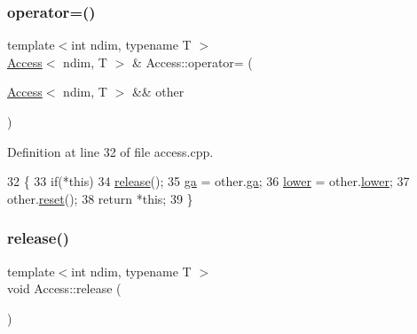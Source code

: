 \hypertarget{classshark_1_1ndim_1_1_access_a221dbc68423570496fd0e1069af4b3d1}{}\label{classshark_1_1ndim_1_1_access_a221dbc68423570496fd0e1069af4b3d1} 
\subsubsection{\texorpdfstring{operator=()}{operator=()}\hspace{0.1cm}{\footnotesize\ttfamily [2/2]}}
{\footnotesize\ttfamily template$<$int ndim, typename T $>$ \\
\hyperlink{classshark_1_1ndim_1_1_access}{Access}$<$ ndim, T $>$ \& Access\+::operator= (\begin{DoxyParamCaption}\item[{\hyperlink{classshark_1_1ndim_1_1_access}{Access}$<$ ndim, T $>$ \&\&}]{other }\end{DoxyParamCaption})}



Definition at line 32 of file access.\+cpp.


\begin{DoxyCode}
32                                                                 \{
33     \textcolor{keywordflow}{if}(*\textcolor{keyword}{this})
34         \hyperlink{classshark_1_1ndim_1_1_access_a22c889d50f5f45566ee12cf04f874701}{release}();
35     \hyperlink{classshark_1_1ndim_1_1_access_abc59e261a07fcecc3f1db641ef04efa7}{ga} = other.\hyperlink{classshark_1_1ndim_1_1_access_abc59e261a07fcecc3f1db641ef04efa7}{ga};
36     \hyperlink{classshark_1_1ndim_1_1_access_ac1e92dba307ff877963c94bd42fcbafb}{lower} = other.\hyperlink{classshark_1_1ndim_1_1_access_ac1e92dba307ff877963c94bd42fcbafb}{lower};
37     other.\hyperlink{classshark_1_1ndim_1_1_access_ae3aeb7637a41a2da81bcda20772ccac4}{reset}();
38     \textcolor{keywordflow}{return} *\textcolor{keyword}{this};
39 \}
\end{DoxyCode}
\hypertarget{classshark_1_1ndim_1_1_access_a22c889d50f5f45566ee12cf04f874701}{}\label{classshark_1_1ndim_1_1_access_a22c889d50f5f45566ee12cf04f874701} 
\subsubsection{\texorpdfstring{release()}{release()}}
{\footnotesize\ttfamily template$<$int ndim, typename T $>$ \\
void Access\+::release (\begin{DoxyParamCaption}{ }\end{DoxyParamCaption})\hspace{0.3cm}{\ttfamily [private]}}



